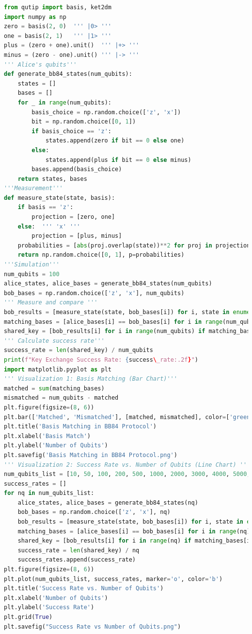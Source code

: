 \documentclass[12pt]{ieeetj}
\begin{document}
\begin{lstlisting}[language=Python, caption=BB84 for QKD, label=code:QKD]
from qutip import basis, ket2dm
import numpy as np
zero = basis(2, 0)  ''' |0> '''
one = basis(2, 1)   ''' |1> ''' 
plus = (zero + one).unit()  ''' |+> '''
minus = (zero - one).unit() ''' |-> ''' 
''' Alice's qubits'''
def generate_bb84_states(num_qubits):
    states = []
    bases = []
    for _ in range(num_qubits):
        basis_choice = np.random.choice(['z', 'x'])
        bit = np.random.choice([0, 1])
        if basis_choice == 'z':
            states.append(zero if bit == 0 else one)
        else:
            states.append(plus if bit == 0 else minus)
        bases.append(basis_choice)
    return states, bases
'''Measurement'''
def measure_state(state, basis):
    if basis == 'z':
        projection = [zero, one]
    else:  ''' 'x' '''
        projection = [plus, minus]
    probabilities = [abs(proj.overlap(state))**2 for proj in projection]
    return np.random.choice([0, 1], p=probabilities)
'''Simulation'''
num_qubits = 100
alice_states, alice_bases = generate_bb84_states(num_qubits)
bob_bases = np.random.choice(['z', 'x'], num_qubits)
''' Measure and compare '''
bob_results = [measure_state(state, bob_bases[i]) for i, state in enumerate(alice_states)]
matching_bases = [alice_bases[i] == bob_bases[i] for i in range(num_qubits)]
shared_key = [bob_results[i] for i in range(num_qubits) if matching_bases[i]]
''' Calculate success rate'''
success_rate = len(shared_key) / num_qubits
print(f"Key Exchange Success Rate: {success\_rate:.2f}")
import matplotlib.pyplot as plt
''' Visualization 1: Basis Matching (Bar Chart)'''
matched = sum(matching_bases)
mismatched = num_qubits - matched
plt.figure(figsize=(8, 6))
plt.bar(['Matched', 'Mismatched'], [matched, mismatched], color=['green', 'red'])
plt.title('Basis Matching in BB84 Protocol')
plt.xlabel('Basis Match')
plt.ylabel('Number of Qubits')
plt.savefig('Basis Matching in BB84 Protocol.png')
''' Visualization 2: Success Rate vs. Number of Qubits (Line Chart) '''
num_qubits_list = [10, 50, 100, 200, 500, 1000, 2000, 3000, 4000, 5000, 8000, 10000]
success_rates = []
for nq in num_qubits_list:
    alice_states, alice_bases = generate_bb84_states(nq)
    bob_bases = np.random.choice(['z', 'x'], nq)
    bob_results = [measure_state(state, bob_bases[i]) for i, state in enumerate(alice_states)]
    matching_bases = [alice_bases[i] == bob_bases[i] for i in range(nq)]
    shared_key = [bob_results[i] for i in range(nq) if matching_bases[i]]
    success_rate = len(shared_key) / nq
    success_rates.append(success_rate)
plt.figure(figsize=(8, 6))
plt.plot(num_qubits_list, success_rates, marker='o', color='b')
plt.title('Success Rate vs. Number of Qubits')
plt.xlabel('Number of Qubits')
plt.ylabel('Success Rate')
plt.grid(True)
plt.savefig("Success Rate vs Number of Qubits.png")

\end{lstlisting}
\end{document}
